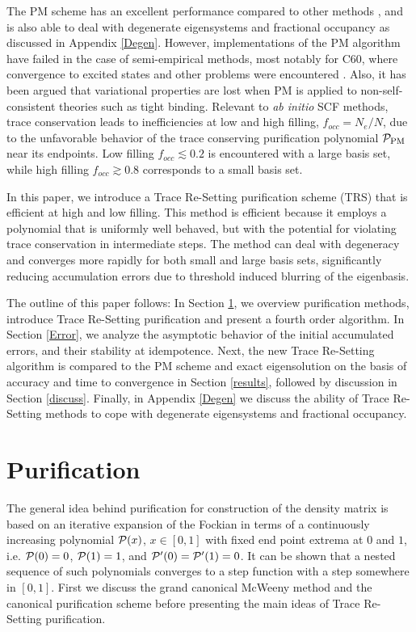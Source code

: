 \commentoutA{\documentclass[prb,aps,twocolumn,showpacs,twocolumngrid,superbib]{revtex4}}
\begin{document}
The PM scheme has an excellent performance compared to other methods \cite{ADaniels99,APalser98,GBerghold02,YShao02}, 
and is also able to deal with degenerate eigensystems and fractional occupancy as discussed in Appendix \ref{Degen}.  
However, implementations of the PM algorithm have failed 
in the case of semi-empirical methods, most notably for C60, where convergence to excited states and 
other problems were encountered \cite{ADaniels99}.   Also, it has been argued that variational properties 
are lost when PM is applied to non-self-consistent theories such as tight binding\cite{APalser98}.
Relevant to {\it ab initio} SCF methods, trace conservation leads to  inefficiencies at low 
and high filling, $f_{occ}=N_e/N$, due to the unfavorable behavior of the trace conserving purification polynomial
${\cal P}_{\rm PM}$ near its endpoints.  Low filling $f_{occ}\lesssim 0.2$  is encountered with a large basis set, 
while high filling $f_{occ} \gtrsim 0.8$ corresponds to a small basis set.

In this paper, we introduce a Trace Re-Setting purification scheme (TRS) 
that is efficient at high and low filling.  This method is 
efficient because it employs a polynomial that is uniformly well behaved, but with the
potential for violating trace conservation in intermediate steps.  The method can deal with
degeneracy and converges more rapidly for both small and large basis sets, significantly reducing 
accumulation errors due to threshold induced blurring of the eigenbasis.

The outline of this paper follows:  In Section \ref{TSP}, we overview purification methods, introduce 
Trace Re-Setting purification
and present a fourth order algorithm.  In Section \ref{Error}, we analyze the asymptotic behavior of 
the initial accumulated errors, and their stability at idempotence.  Next, the new Trace Re-Setting 
algorithm is compared to the PM scheme and exact eigensolution on the basis of accuracy and time to 
convergence in Section \ref{results}, followed by discussion in Section \ref{discuss}.  Finally,
in Appendix \ref{Degen} we discuss the ability of Trace Re-Setting methods to cope with degenerate 
eigensystems and fractional occupancy.  

\section{Purification}\label{TSP}

The general idea behind purification for construction 
of the density matrix is based on an iterative expansion of the
Fockian in terms of a continuously increasing 
polynomial ${\cal P}(x)$, $x \in [0,1]$  with fixed end point extrema
at $0$ and $1$, i.e. ${\cal P}(0) = 0$, ${\cal P}(1) = 1$, and ${\cal P}'(0)={\cal P}'(1)=0$. 
It can be shown that a nested sequence of such polynomials 
converges to a step function with a step somewhere in $[0,1]$. 
First we discuss the grand canonical McWeeny method and the canonical
purification scheme before presenting the main ideas of Trace Re-Setting purification.
\end{document}
